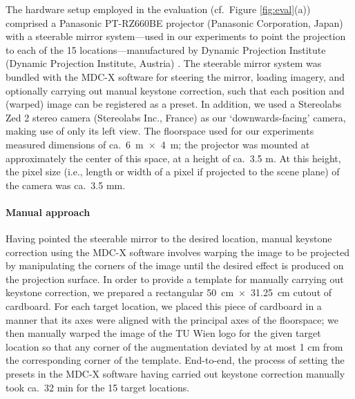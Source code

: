 \documentclass[review]{elsarticle}
\begin{document}
The hardware setup employed in the evaluation (cf.\ Figure \ref{fig:eval}(a)) comprised a Panasonic PT-RZ660BE projector (Panasonic Corporation, Japan) with a steerable mirror system---used in our experiments to point the projection to each of the 15 locations---manufactured by Dynamic Projection Institute (Dynamic Projection Institute, Austria) \cite{rupprecht2020information,Rupprecht2021}. The steerable mirror system was bundled with the MDC-X software for steering the mirror, loading imagery, and optionally carrying out manual keystone correction, such that each position and (warped) image can be registered as a preset. In addition, we used a Stereolabs Zed 2 stereo camera (Stereolabs Inc., France) as our `downwards-facing' camera, making use of only its left view. The floorspace used for our experiments measured dimensions of ca.\ 6~m~$\times$~4~m; the projector was mounted at approximately the center of this space, at a height of ca.\ 3.5 m. At this height, the pixel size (i.e., length or width of a pixel if projected to the scene plane) of the camera was ca.\ 3.5 mm.

\paragraph{Manual approach} Having pointed the steerable mirror to the desired location, manual keystone correction using the MDC-X software involves warping the image to be projected by manipulating the corners of the image until the desired effect is produced on the projection surface. In order to provide a template for manually carrying out keystone correction, we prepared a rectangular 50~cm~$\times$~31.25~cm cutout of cardboard. For each target location, we placed this piece of cardboard in a manner that its axes were aligned with the principal axes of the floorspace; we then manually warped the image of the TU Wien logo for the given target location so that any corner of the augmentation deviated by at most 1 cm from the corresponding corner of the template. End-to-end, the process of setting the presets in the MDC-X software having carried out keystone correction manually took ca.\ 32 min for the 15 target locations.
\end{document}
